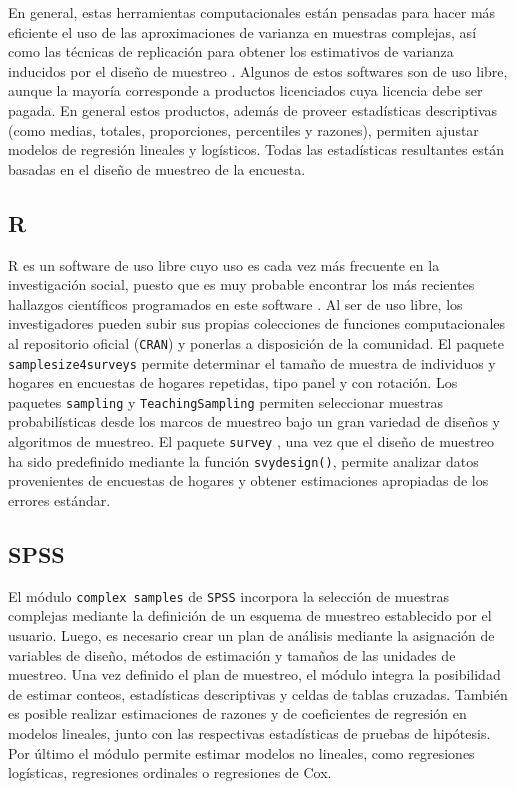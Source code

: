 \documentclass[12pt,spanish,]{book}
\begin{document}
En general, estas herramientas computacionales están pensadas para hacer más eficiente el uso de las aproximaciones de varianza en muestras complejas, así como las técnicas de replicación para obtener los estimativos de varianza inducidos por el diseño de muestreo \autocite{Westat_2007}. Algunos de estos softwares son de uso libre, aunque la mayoría corresponde a productos licenciados cuya licencia debe ser pagada. En general estos productos, además de proveer estadísticas descriptivas (como medias, totales, proporciones, percentiles y razones), permiten ajustar modelos de regresión lineales y logísticos. Todas las estadísticas resultantes están basadas en el diseño de muestreo de la encuesta.

\hypertarget{r}{%
\subsection*{R}\label{r}}

R es un software de uso libre cuyo uso es cada vez más frecuente en la investigación social, puesto que es muy probable encontrar los más recientes hallazgos científicos programados en este software \autocite{R_2017}. Al ser de uso libre, los investigadores pueden subir sus propias colecciones de funciones computacionales al repositorio oficial (\texttt{CRAN}) y ponerlas a disposición de la comunidad. El paquete \texttt{samplesize4surveys} \autocite{ss4s} permite determinar el tamaño de muestra de individuos y hogares en encuestas de hogares repetidas, tipo panel y con rotación. Los paquetes \texttt{sampling} \autocite{Yves} y \texttt{TeachingSampling} \autocite{TS} permiten seleccionar muestras probabilísticas desde los marcos de muestreo bajo un gran variedad de diseños y algoritmos de muestreo. El paquete \texttt{survey} \autocite{TL}, una vez que el diseño de muestreo ha sido predefinido mediante la función \texttt{svydesign()}, permite analizar datos provenientes de encuestas de hogares y obtener estimaciones apropiadas de los errores estándar.

\hypertarget{spss}{%
\subsection*{SPSS}\label{spss}}

El módulo \texttt{complex\ samples} de \texttt{SPSS} \autocite{IBM_2017} incorpora la selección de muestras complejas mediante la definición de un esquema de muestreo establecido por el usuario. Luego, es necesario crear un plan de análisis mediante la asignación de variables de diseño, métodos de estimación y tamaños de las unidades de muestreo. Una vez definido el plan de muestreo, el módulo integra la posibilidad de estimar conteos, estadísticas descriptivas y celdas de tablas cruzadas. También es posible realizar estimaciones de razones y de coeficientes de regresión en modelos lineales, junto con las respectivas estadísticas de pruebas de hipótesis. Por último el módulo permite estimar modelos no lineales, como regresiones logísticas, regresiones ordinales o regresiones de Cox.
\end{document}
